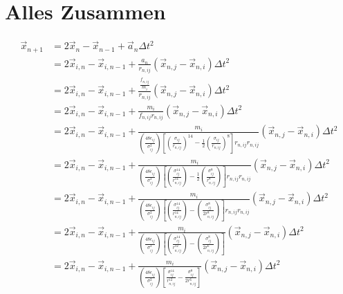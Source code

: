 \documentclass{article}
\begin{document}
\section*{Alles Zusammen}
\begin{align}
	\vec{x}_{n+1}&=2\vec{x}_n-\vec{x}_{n-1}+\vec{a}_n\Delta t^2\\
	&=2\vec{x}_{i,n}-\vec{x}_{i,n-1}+\frac{a_n}{r_{n,ij}}\left(\vec{x}_{n,j}-\vec{x}_{n,i}\right)\Delta t^2\\
	&=2\vec{x}_{i,n}-\vec{x}_{i,n-1}+\frac{\frac{f_{n,ij}}{m_i}}{r_{n,ij}}\left(\vec{x}_{n,j}-\vec{x}_{n,i}\right)\Delta t^2\\	
	&=2\vec{x}_{i,n}-\vec{x}_{i,n-1}+\frac{m_i}{f_{n,ij}r_{n,ij}}\left(\vec{x}_{n,j}-\vec{x}_{n,i}\right)\Delta t^2\\	
	&=2\vec{x}_{i,n}-\vec{x}_{i,n-1}+\frac{m_i}{\left(\frac{48\epsilon_{ij}}{\sigma_{ij}^2}\right)\left[\left(\frac{\sigma_{ij}}{r_{n,ij}}\right)^{14}-\frac{1}{2}\left(\frac{\sigma_{ij}}{r_{n,ij}}\right)^8\right]r_{n,ij}r_{n,ij}}\left(\vec{x}_{n,j}-\vec{x}_{n,i}\right)\Delta t^2\\	
	&=2\vec{x}_{i,n}-\vec{x}_{i,n-1}+\frac{m_i}{\left(\frac{48\epsilon_{ij}}{\sigma_{ij}^2}\right)\left[\left(\frac{\sigma_{ij}^{14}}{r_{n,ij}^{14}}\right)-\frac{1}{2}\left(\frac{\sigma_{ij}^8}{r_{n,ij}^8}\right)\right]r_{n,ij}r_{n,ij}}\left(\vec{x}_{n,j}-\vec{x}_{n,i}\right)\Delta t^2\\	
	&=2\vec{x}_{i,n}-\vec{x}_{i,n-1}+\frac{m_i}{\left(\frac{48\epsilon_{ij}}{\sigma_{ij}^2}\right)\left[\left(\frac{\sigma_{ij}^{14}}{r_{n,ij}^{14}}\right)-\left(\frac{\sigma_{ij}^8}{2r_{n,ij}^8}\right)\right]r_{n,ij}r_{n,ij}}\left(\vec{x}_{n,j}-\vec{x}_{n,i}\right)\Delta t^2\\	
	&=2\vec{x}_{i,n}-\vec{x}_{i,n-1}+\frac{m_i}{\left(\frac{48\epsilon_{ij}}{\sigma_{ij}^2}\right)\left[\left(\frac{\sigma_{ij}^{14}}{r_{n,ij}^{12}}\right)-\left(\frac{\sigma_{ij}^8}{2r_{n,ij}^6}\right)\right]}\left(\vec{x}_{n,j}-\vec{x}_{n,i}\right)\Delta t^2\\	
	&=2\vec{x}_{i,n}-\vec{x}_{i,n-1}+\frac{m_i}{\left(\frac{48\epsilon_{ij}}{\sigma_{ij}^2}\right)\left[\frac{\sigma_{ij}^{14}}{r_{n,ij}^{12}}-\frac{\sigma_{ij}^8}{2r_{n,ij}^6}\right]}\left(\vec{x}_{n,j}-\vec{x}_{n,i}\right)\Delta t^2\\	
\end{align}
\end{document}
